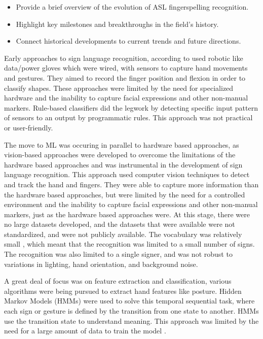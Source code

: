 \begin{itemize}
    \item Provide a brief overview of the evolution of ASL fingerspelling recognition.
    \item Highlight key milestones and breakthroughs in the field's history.
    \item Connect historical developments to current trends and future directions.
\end{itemize}

Early approaches to sign language recognition, according to \cite{saeedSystematicReviewSystemsBased2022} used robotic like data/power gloves which were wired, with sensors to capture hand movements and gestures. They aimed to record the finger position and flexion in order to classify shapes. These approaches were limited by the need for specialized hardware and the inability to capture facial expressions and other non-manual markers. Rule-based classifiers did the legwork by detecting specific input pattern of sensors to an output by programmatic rules. This approach was not practical or user-friendly.

The move to ML was occuring in parallel to hardware based approaches, as vision-based approaches were developed to overcome the limitations of the hardware based approaches and was instrumental in the development of sign language recognition. This approach used computer vision techniques to detect and track the hand and fingers. They were able to capture more information than the hardware based approaches, but were limited by the need for a controlled environment and the inability to capture facial expressions and other non-manual markers, just as the hardware based approaches were. At this stage, there were no large datasets developed, and the datasets that were available were not standardized, and were not publicly available. The vocabulary was relatively small \cite{vonagrisRecentDevelopmentsVisual2008}, which meant that the recognition was limited to a small number of signs. The recognition was also limited to a single signer, and was not robust to variations in lighting, hand orientation, and background noise.

A great deal of focus was on feature extraction and classification, various algorithms were being pursued to extract hand features like posture. Hidden Markov Models (HMMs) were used to solve this temporal sequential task, where each sign or gesture is defined by the transition from one state to another. HMMs use the transition state to understand meaning. This approach was limited by the need for a large amount of data to train the model \cite{vonagrisRecentDevelopmentsVisual2008}.

